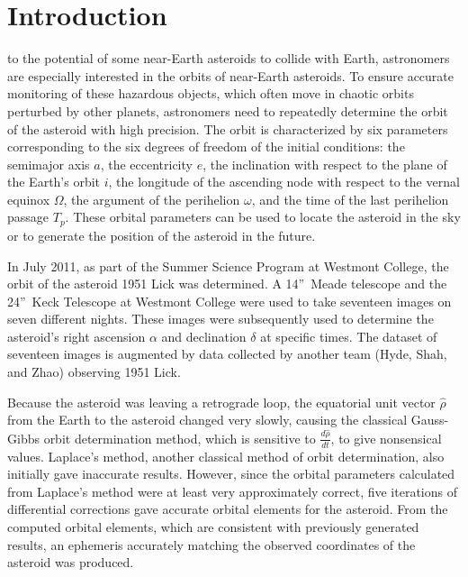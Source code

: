 \documentclass[12pt,journal,compsoc]{IEEEtran}
\begin{document}
\maketitle

\IEEEdisplaynotcompsoctitleabstractindextext
\IEEEpeerreviewmaketitle

\section{Introduction}
to the potential of some near-Earth asteroids to collide with Earth, 
astronomers are especially interested in the orbits of near-Earth asteroids.
To ensure accurate monitoring of these hazardous objects, 
which often move in chaotic orbits perturbed by other planets, 
astronomers need to repeatedly determine the orbit of the asteroid with high precision.  
The orbit is characterized by six parameters
corresponding to the six degrees of freedom of the initial conditions: 
the semimajor axis $a$, 
the eccentricity $e$, 
the inclination with respect to the plane of the Earth's orbit $i$, 
the longitude of the ascending node with respect to the vernal equinox $\Omega$, 
the argument of the perihelion $\omega$, 
and the time of the last perihelion passage $T_p$.  
These orbital parameters can be used to locate the asteroid in the sky or to generate the position of the asteroid in the future.

In July 2011, as part of the Summer Science Program at Westmont College, the orbit of the asteroid 1951 Lick was determined. 
A 14''~Meade telescope and the 24''~Keck Telescope at Westmont College were used to take seventeen images on seven different nights. 
These images were subsequently used to determine the asteroid's right ascension $\alpha$ and declination $\delta$ at specific times.
The dataset of seventeen images is augmented by data collected by another team (Hyde, Shah, and Zhao) observing 1951 Lick.

Because the asteroid was leaving a retrograde loop, 
the equatorial unit vector $\hat{\rho}$ from the Earth to the asteroid changed very slowly, 
causing the classical Gauss-Gibbs orbit determination method, which is sensitive to $\frac{d\hat{\rho}}{dt}$, 
to give nonsensical values.
Laplace's method, 
another classical method of orbit determination, 
also initially gave inaccurate results. 
However, since the orbital parameters calculated from Laplace's method were at least very approximately correct, 
five iterations of differential corrections gave accurate orbital elements for the asteroid.
From the computed orbital elements, which are consistent with previously generated results, 
an ephemeris accurately matching the observed coordinates of the asteroid was produced.
\end{document}
